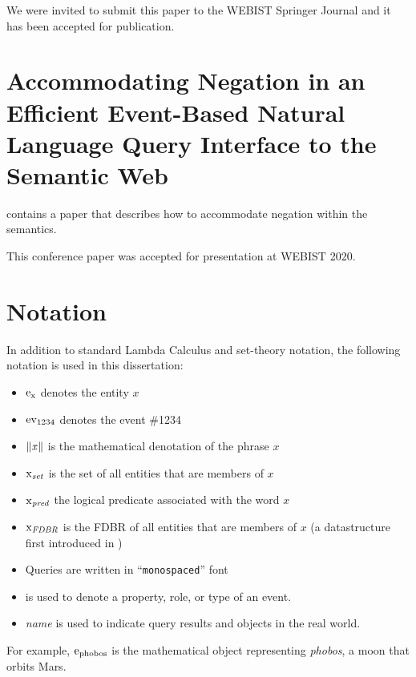 \documentclass[../main.tex]{subfiles}
\begin{document}
\begin{refsection}

We were invited to submit this paper to the WEBIST Springer Journal and it has been accepted for publication.

\section{Accommodating Negation in an Efficient Event-Based Natural Language Query Interface to the Semantic Web}

\textbf{} contains a paper that describes how to accommodate negation
within the semantics.

This conference paper was accepted for presentation at WEBIST 2020.


\section{Notation}

In addition to standard Lambda Calculus and set-theory notation, the following notation is used in this dissertation:
\begin{itemize}
    \item $\mathrm{e}_{\operatorname{x}}$ denotes the entity $x$
    \item $\operatorname{ev}_{1234}$ denotes the event \#1234
    \item $\lVert\textit{x\hspace{0.1em}}\rVert$ is the mathematical denotation of the phrase $x$
    \item $\operatorname{x}_{\operatorname{\mathit{set}}}$ is the set of all entities that are members of $x$
    \item $\operatorname{x}_{\operatorname{\mathit{pred}}}$ the logical predicate associated with the word $x$
    \item $\operatorname{x}_{\operatorname{\mathit{FDBR}}}$ is the FDBR of all entities that are members of $x$ (a datastructure first introduced in )
    \item Queries are written in ``\texttt{monospaced}'' font
    \item {} is used to denote a property, role, or type of an event.
    \item \textit{name} is used to indicate query results and objects in the real world.
\end{itemize}
For example, $\mathrm{e}_{\operatorname{phobos}}$ is the mathematical object representing \textit{phobos}, a moon that orbits Mars.


\printbibliography[heading=subbibintoc]
\end{refsection}
\end{document}
